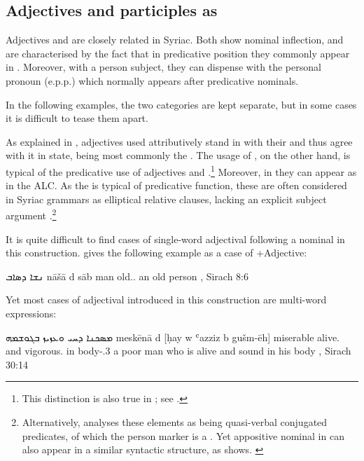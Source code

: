 {{\subsection{Adjectives and participles as \secns} \label{ss:syr_adjSecn}

Adjectives and  are closely related in Syriac. Both show nominal inflection, and are characterised by the fact that in predicative position they commonly appear in \abs*. Moreover, with a \third person subject, they can dispense with the  personal pronoun (e.p.p.) which normally appears after predicative nominals.

  In the following examples, the two categories are kept separate, but in some cases it is difficult to tease them apart. 

As explained in , adjectives used attributively stand in  with their  and thus agree with it in state, being most commonly the \emp*. The usage of \abs*, on the other hand, is typical of the predicative use of adjectives and .\footnote{This distinction is also true in \JBA; see \citet[63]{BarAsherJBA}.}
Moreover, in  \abs* they can appear as \secns in the ALC. As the \abs* is typical of predicative function, these \secns are often considered in Syriac grammars as elliptical relative clauses, lacking an explicit subject argument \parencites[66, \S 94]{MuraokaHebraists}[211ff.]{PeursenBenSira}.\footnote{Alternatively, \citet[115, \S\S 9--10]{GoldenbergSyriac} analyses these elements  as being quasi-verbal conjugated predicates, of which the \third person marker is a \zero. Yet appositive nominal \secns in \emp* can also appear in a similar syntactic structure, as   shows. \label{ft:syr_abs_adj_zero}}

It is quite difficult to find cases of single-word adjectival \secns  following a nominal \prim in this construction. \citet{PeursenBenSira} gives the following example as a case of \D+Adjective:

{ܢܫܐ ܕܣܐܒ}
{nāšā d\cb{} sāb}
{man \lnk\cb{} old.\abs.\masc}
{an old person}
{\Pesh, Sirach 8:6 \apud \cite[211]{PeursenBenSira}}

Yet  most cases of adjectival \secns introduced in this construction are multi-word expressions:

{ܡܣܟܢܐ ܕܚܝ ܘܥܙܝܙ ܒܓܘܫܡܗ}
{meskēnā d\cb{} [ḥay w\cb{} ʿazziz b\cb{} gušm-ēh]}
{miserable \lnk\cb{} alive.\abs{} and\cb{} vigorous.\abs{} in\cb{} body-\poss.3\masc}
{a poor man who is alive and sound in his body}
{\Pesh, Sirach 30:14 \apud \cite[212]{PeursenBenSira}}

}}
